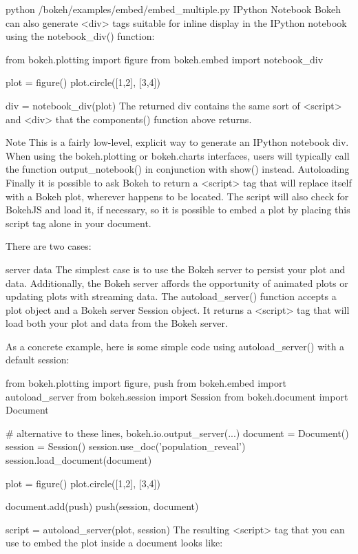 python /bokeh/examples/embed/embed_multiple.py
IPython Notebook
Bokeh can also generate <div> tags suitable for inline display in the IPython notebook using the notebook_div() function:

from bokeh.plotting import figure
from bokeh.embed import notebook_div

plot = figure()
plot.circle([1,2], [3,4])

div = notebook_div(plot)
The returned div contains the same sort of <script> and <div> that the components() function above returns.

Note
This is a fairly low-level, explicit way to generate an IPython notebook div. When using the bokeh.plotting or bokeh.charts interfaces, users will typically call the function output_notebook() in conjunction with show() instead.
Autoloading
Finally it is possible to ask Bokeh to return a <script> tag that will replace itself with a Bokeh plot, wherever happens to be located. The script will also check for BokehJS and load it, if necessary, so it is possible to embed a plot by placing this script tag alone in your document.

There are two cases:

server data
The simplest case is to use the Bokeh server to persist your plot and data. Additionally, the Bokeh server affords the opportunity of animated plots or updating plots with streaming data. The autoload_server() function accepts a plot object and a Bokeh server Session object. It returns a <script> tag that will load both your plot and data from the Bokeh server.

As a concrete example, here is some simple code using autoload_server() with a default session:

from bokeh.plotting import figure, push
from bokeh.embed import autoload_server
from bokeh.session import Session
from bokeh.document import Document

# alternative to these lines, bokeh.io.output_server(...)
document = Document()
session = Session()
session.use_doc('population_reveal')
session.load_document(document)

plot = figure()
plot.circle([1,2], [3,4])

document.add(push)
push(session, document)

script = autoload_server(plot, session)
The resulting <script> tag that you can use to embed the plot inside a document looks like:

